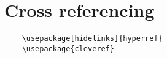 \section{Cross referencing}

\begin{verbatim}
    \usepackage[hidelinks]{hyperref}
    \usepackage{cleveref}
\end{verbatim}